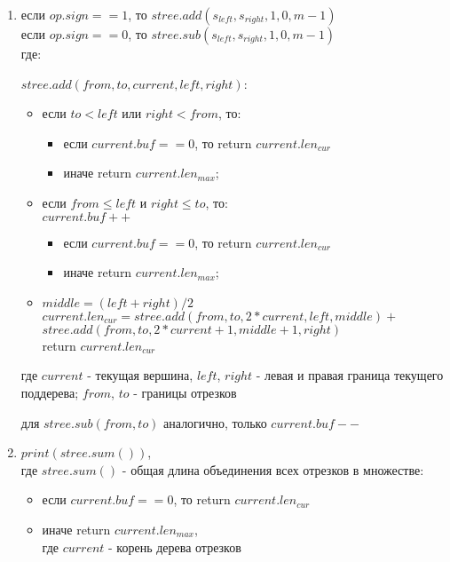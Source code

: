 \documentclass[12pt]{article}
\begin{document}
\begin{enumerate}
\begin{enumerate}
	\item если $op.sign == 1$, то $stree.add(s_{left}, s_{right}, 1, 0, m-1)$ \\
		  если $op.sign == 0$, то $stree.sub(s_{left}, s_{right}, 1, 0, m-1)$ \\		  
		  
		  где:
		  
		  $stree.add(from, to, current, left, right)$:
		  
		  \begin{itemize}
		  
		  \item если $to < left$ или $right < from$, то:
		  		\begin{itemize}
		  			\item если $current.buf == 0$, то return $current.len_{cur}$
		  			\item иначе return $current.len_{max}$; 
		  		\end{itemize}
		  
		  \item если $from \leq left$ и $right \leq to$, то:\\
		  		$current.buf++$
		  		\begin{itemize}
		  			\item если $current.buf == 0$, то return $current.len_{cur}$
		  			\item иначе return $current.len_{max}$; 
		  		\end{itemize}
		  
		  \item $middle = (left + right)/2$\\
		  		$current.len_{cur} = stree.add(from, to, 2*current, left, middle)  +$\\ $stree.add(from, to, 2*current+1, middle+1, right)$\\
		  		return $current.len_{cur}$ 
		  
		  
		  \end{itemize}
		  
		  где $current$ - текущая вершина, $left$, $right$ - левая и правая граница текущего поддерева; $from$, $to$ - границы отрезков
		  
		  для $stree.sub(from, to)$ аналогично, только $current.buf--$
	
	\item $print(stree.sum())$,\\
	где $stree.sum()$ - общая длина объединения всех отрезков в множестве:
	\begin{itemize}
		\item если $current.buf == 0$, то return $current.len_{cur}$
		\item иначе return $current.len_{max}$,\\
		где $current$ - корень дерева отрезков
	\end{itemize}
	

	\end{enumerate}
		
\end{enumerate}
		
\end{document}
